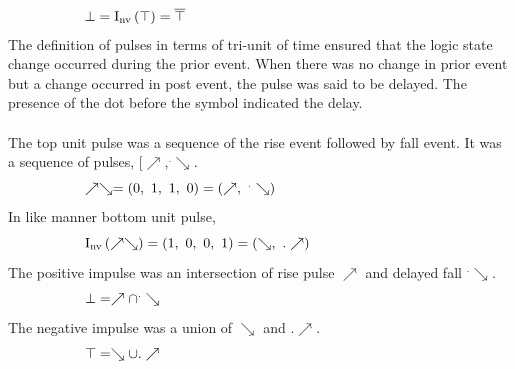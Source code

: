 \documentclass[10pt,journal]{IEEEtran}
\begin{document}
\begin{equation}
 \begin{minipage}{250pt}
\begin{flushleft} $\displaystyle \bot = \operatorname{I_{nv}}{\left(\top \right)} = \overline\top$  \end{flushleft}
 \end{minipage}
 \end{equation}
The definition of pulses in terms of tri-unit of time ensured that the     logic state change occurred during the prior event. When there was no    change in prior event but a change occurred in post event, the pulse     was said to be delayed. The presence of the dot before the symbol indicated     the delay.\\ \ \\ 
The top unit pulse was a sequence of the rise event followed by fall event.     It was a sequence of pulses, [$\nearrow$,$^.\searrow$. 
\begin{equation}
 \begin{minipage}{250pt}
\begin{flushleft} $\displaystyle \nearrow\searrow = \left( 0, \  1, \  1, \  0\right) = \left( \nearrow, \  ^.\searrow\right)$  \end{flushleft}
 \end{minipage}
 \end{equation}
In like manner bottom unit pulse,
\begin{equation}
 \begin{minipage}{250pt}
\begin{flushleft} $\displaystyle \operatorname{I_{nv}}{\left(\nearrow\searrow \right)} = \left( 1, \  0, \  0, \  1\right) = \left( \searrow, \  .\nearrow\right)$  \end{flushleft}
 \end{minipage}
 \end{equation}
The positive impulse was an intersection of rise pulse $\nearrow$ and delayed fall $^.\searrow$.
\begin{equation}
 \begin{minipage}{250pt}
\begin{flushleft} $\displaystyle \bot = \nearrow \cap ^.\searrow$  \end{flushleft}
 \end{minipage}
 \end{equation}
The negative impulse was a union of $\searrow$ and $.\nearrow$.
\begin{equation}
 \begin{minipage}{250pt}
\begin{flushleft} $\displaystyle \top = \searrow \cup .\nearrow$  \end{flushleft}
 \end{minipage}
 \end{equation}
\end{document}
